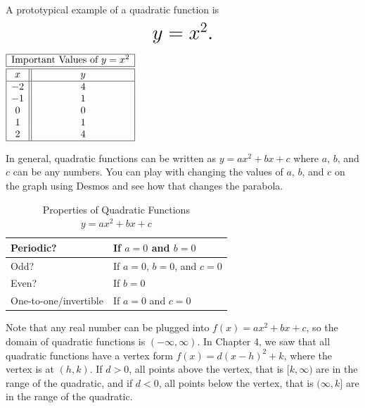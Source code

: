 \documentclass[nooutcomes]{ximera}
\begin{document}
\begin{example}
A prototypical example of a quadratic function is $$ \mbox{\huge $y=x^2.$}$$

\begin{image}
\end{image}

\begin{center}
\(
\begin{array}{ |c || c|  }
 \hline
 \multicolumn{2}{|c|}{\text{\normalfont Important Values of } y=x^2} \\
\hline
 \hline
 x & y\\
 \hline
 -2&4\\
 -1&1\\
 0&0\\
 1&1\\
 2&4\\
 \hline
\end{array}
\)
\end{center}
\end{example}

In general, quadratic functions can be written as $y=ax^2+bx+c$ where $a$, $b$, and $c$ can be any numbers.  You can play with changing the values of $a$, $b$, and $c$ on the graph using Desmos and see how that changes the parabola.  

\begin{center}  
\end{center}

\begin{table}[h]
\caption{\label{tab:quadraticproperties}Properties of Quadratic Functions $y = ax^2 + bx + c$}
\centering
\begin{tabular}{l|l}
Periodic? & If $a = 0$ and $b = 0$ \\ \hline
Odd? &  If $a = 0$, $b = 0$, and $c = 0$ \\ \hline
Even? & If $b = 0$ \\ \hline
One-to-one/invertible & If $a = 0$ and $c = 0$ 
\end{tabular}
\end{table}

Note that any real number can be plugged into $f(x) = ax^2 + bx + c$, so the domain of quadratic functions is $(-\infty, \infty)$. In Chapter 4, we saw that all quadratic functions have a vertex form $f(x) = d(x - h)^2 + k$, where the vertex is at $(h, k)$. If $d > 0$, all points above the vertex, that is $[k, \infty)$ are in the range of the quadratic, and if $d < 0$, all points below the vertex, that is $(\infty, k]$ are in the range of the quadratic.
\end{document}
